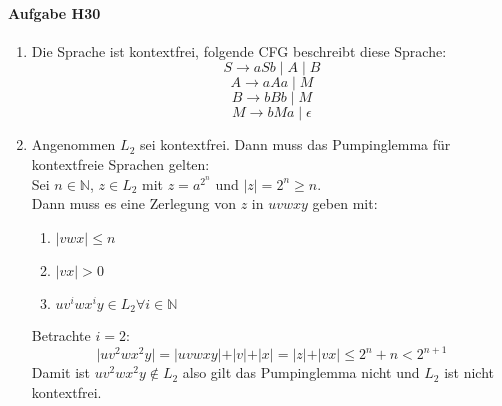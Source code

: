\documentclass[11pt]{article}
\begin{document}

\paragraph{Aufgabe H30}
\begin{enumerate}[label=\arabic*)]
\item Die Sprache ist kontextfrei, folgende CFG beschreibt diese Sprache:
\[S\rightarrow aSb \mid A \mid B\]
\[A\rightarrow aAa \mid M\]
\[B\rightarrow bBb \mid M\]
\[M\rightarrow bMa \mid \epsilon\]

\item Angenommen $L_2$ sei kontextfrei. Dann muss das Pumpinglemma für kontextfreie Sprachen gelten:
\\Sei $n\in\mathbb{N}$, $z\in L_2$ mit $z=a^{2^n}$ und $\vert z \vert = 2^n \geq n$.
\\Dann muss es eine Zerlegung von $z$ in $uvwxy$ geben mit:
\begin{enumerate}[label=(\arabic*)]
\item $\vert vwx \vert \leq n$
\item $\vert vx \vert > 0$
\item $uv^iwx^iy\in L_2 \forall i\in\mathbb{N}$
\end{enumerate}
Betrachte $i=2$:
\[\vert uv^2wx^2y \vert = \vert uvwxy \vert + \vert v \vert + \vert x \vert = \vert z \vert + \vert vx \vert \leq 2^n+n < 2^{n+1}\]
Damit ist $uv^2wx^2y\not\in L_2$ also gilt das Pumpinglemma nicht und $L_2$ ist nicht kontextfrei.


\end{enumerate}
\end{document}
